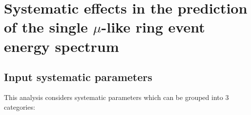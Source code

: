 \clearpage

\section {Systematic effects in the prediction of the single $\mu$-like ring event energy spectrum}
\label{sec:systematics}


\subsection {Input systematic parameters}
\label{sec:systematics:inputs}

This analysis considers \NSyst{} systematic parameters which can be grouped into 3 categories:


